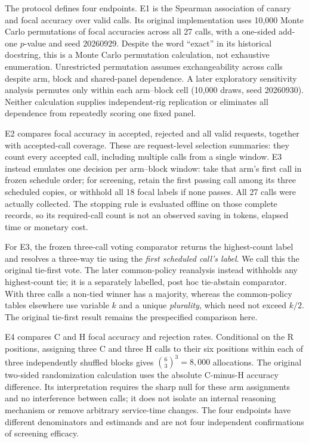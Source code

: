 The protocol defines four endpoints. E1 is the Spearman association of canary and focal accuracy over valid calls. Its original implementation uses 10,000 Monte Carlo permutations of focal accuracies across all 27 calls, with a one-sided add-one $p$-value and seed 20260929. Despite the word ``exact'' in its historical docstring, this is a Monte Carlo permutation calculation, not exhaustive enumeration. Unrestricted permutation assumes exchangeability across calls despite arm, block and shared-panel dependence. A later exploratory sensitivity analysis permutes only within each arm--block cell (10,000 draws, seed 20260930). Neither calculation supplies independent-rig replication or eliminates all dependence from repeatedly scoring one fixed panel.

E2 compares focal accuracy in accepted, rejected and all valid requests, together with accepted-call coverage. These are request-level selection summaries: they count every accepted call, including multiple calls from a single window. E3 instead emulates one decision per arm--block window: take that arm's first call in frozen schedule order; for screening, retain the first passing call among its three scheduled copies, or withhold all 18 focal labels if none passes. All 27 calls were actually collected. The stopping rule is evaluated offline on those complete records, so its required-call count is not an observed saving in tokens, elapsed time or monetary cost.

For E3, the frozen three-call voting comparator returns the highest-count label and resolves a three-way tie using the \emph{first scheduled call's label}. We call this the original tie-first vote. The later common-policy reanalysis instead withholds any highest-count tie; it is a separately labelled, post hoc tie-abstain comparator. With three calls a non-tied winner has a majority, whereas the common-policy tables elsewhere use variable $k$ and a unique \emph{plurality}, which need not exceed $k/2$. The original tie-first result remains the prespecified comparison here.

E4 compares C and H focal accuracy and rejection rates. Conditional on the R positions, assigning three C and three H calls to their six positions within each of three independently shuffled blocks gives $\binom{6}{3}^{3}=8{,}000$ allocations. The original two-sided randomization calculation uses the absolute C-minus-H accuracy difference. Its interpretation requires the sharp null for these arm assignments and no interference between calls; it does not isolate an internal reasoning mechanism or remove arbitrary service-time changes. The four endpoints have different denominators and estimands and are not four independent confirmations of screening efficacy.

